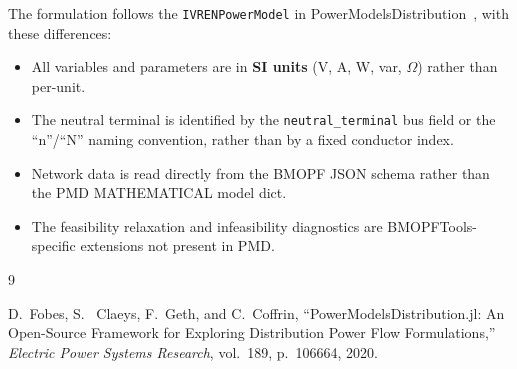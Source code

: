 \documentclass[11pt,a4paper]{article}
\begin{document}
The formulation follows the \texttt{IVRENPowerModel} in
PowerModelsDistribution~\cite{PowerModelsDistribution2022}, with these
differences:
%
\begin{itemize}
  \item All variables and parameters are in \textbf{SI units} (V, A, W, var,
        $\Omega$) rather than per-unit.

  \item The neutral terminal is identified by the \texttt{neutral\_terminal}
        bus field or the ``n''/``N'' naming convention, rather than by a fixed
        conductor index.

  \item Network data is read directly from the BMOPF JSON schema rather than
        the PMD MATHEMATICAL model dict.

  \item The feasibility relaxation and infeasibility diagnostics are
        BMOPFTools-specific extensions not present in PMD.
\end{itemize}


\begin{thebibliography}{9}

D.~Fobes, S.~ Claeys, F.~Geth, and C.~Coffrin,
``PowerModelsDistribution.jl: An Open-Source Framework for Exploring
  Distribution Power Flow Formulations,''
\emph{Electric Power Systems Research}, vol.~189, p.~106664, 2020.

\end{thebibliography}
\end{document}
